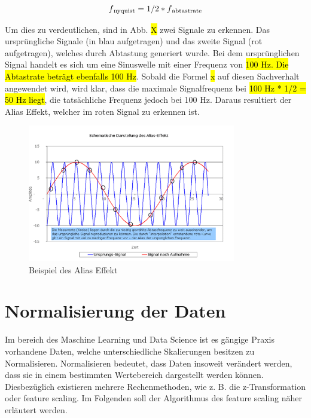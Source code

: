 \begin{equation}
\label{Nyquist}
f\textsubscript{nyquist} = 1/2 * f\textsubscript{abtastrate}
\end{equation}


Um dies zu verdeutlichen, sind in Abb. \hl{X} zwei Signale zu erkennen. Das ursprüngliche Signale (in blau aufgetragen) und das zweite Signal (rot aufgetragen), welches durch Abtastung generiert wurde. Bei dem ursprünglichen Signal handelt es sich um eine Sinuswelle mit einer Frequenz von \hl{100 Hz. Die Abtastrate beträgt ebenfalls 100 Hz}. Sobald die Formel \hl{x} auf diesen Sachverhalt angewendet wird, wird klar, dass die maximale Signalfrequenz bei \hl{100 Hz * 1/2 = 50 Hz liegt}, die tatsächliche Frequenz jedoch bei 100 Hz. Daraus resultiert der Alias Effekt, welcher im roten Signal zu erkennen ist.

\begin{figure}[H]
    \centering
    \includegraphics[height= 6cm, width = \textwidth]{Pictures/Alias.png}
    \caption{Beispiel des Alias Effekt}
\end{figure}

\section{Normalisierung der Daten}
Im bereich des Maschine Learning und Data Science ist es gängige Praxis vorhandene Daten, welche unterschiedliche Skalierungen besitzen zu Normalisieren. Normalisieren bedeutet, dass Daten insoweit verändert werden, dass sie in einem bestimmten Wertebereich dargestellt werden können. Diesbezüglich existieren mehrere Rechenmethoden, wie z. B. die z-Transformation oder feature scaling. Im Folgenden soll der Algorithmus des feature scaling näher erläutert werden. 


